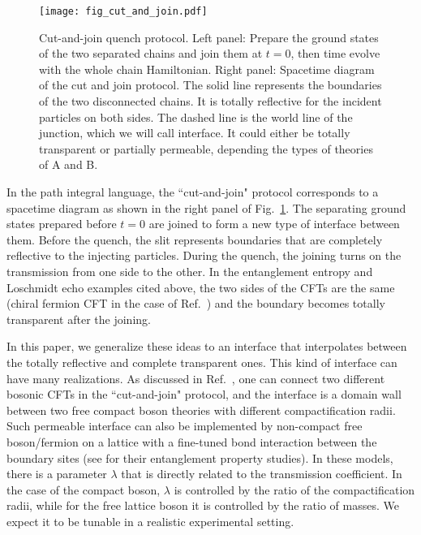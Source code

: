 \begin{figure}[h]
\texttt{[image: fig\_cut\_and\_join.pdf]}
\caption{Cut-and-join quench protocol. Left panel: Prepare the ground states of the two separated chains and join them at $t = 0$, then time evolve with the whole chain Hamiltonian. Right panel: Spacetime diagram of the cut and join protocol. The solid line represents the boundaries of the two disconnected chains. It is totally reflective for the incident particles on both sides. The dashed line is the world line of the junction, which we will call interface. It could either be totally transparent or partially permeable, depending the types of theories of A and B.}
\label{fig:cut-and-join}
\end{figure}

In the path integral language, the ``cut-and-join" protocol corresponds to a spacetime diagram as shown in the right panel of Fig.~\ref{fig:cut-and-join}. The separating ground states prepared before $t = 0$ are joined to form a new type of interface between them. Before the quench, the slit represents boundaries that are completely reflective to the injecting particles. During the quench, the joining turns on the transmission from one side to the other. In the entanglement entropy and Loschmidt echo examples cited above\cite{calabrese_entanglement_2007, calabrese_quantum_2016, vasseur_universal_2014}, the two sides of the CFTs are the same (chiral fermion CFT in the case of Ref.~) and the boundary becomes totally transparent after the joining. 

In this paper, we generalize these ideas to an interface that interpolates between the totally reflective and complete transparent ones. This kind of interface can have many realizations. As discussed in Ref.~, one can connect two different bosonic CFTs in the ``cut-and-join" protocol, and the interface is a domain wall between two free compact boson theories with different compactification radii. Such permeable interface can also be implemented by non-compact free boson/fermion on a lattice with a fine-tuned bond interaction between the boundary sites (see  for their entanglement property studies). In these models, there is a parameter $\lambda$ that is directly related to the transmission coefficient. In the case of the compact boson, $\lambda$ is controlled by the ratio of the compactification radii, while for the free lattice boson it is controlled by the ratio of masses. We expect it to be tunable in a realistic experimental setting.

